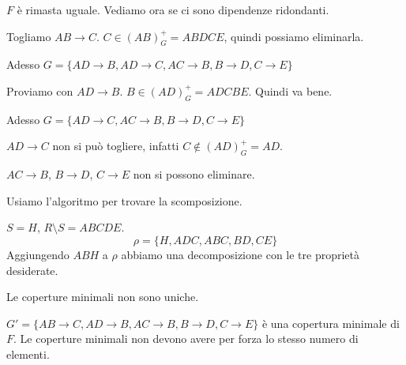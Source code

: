 \begin{exmp}
$F$ \`e rimasta uguale. Vediamo ora se ci sono dipendenze ridondanti.

Togliamo $AB \to C$. $C \in (AB)^+_G = ABDCE$, quindi possiamo eliminarla.

Adesso $G = \{ AD \to B, AD \to C, AC \to B, B \to D, C \to E \}$

Proviamo con $AD \to B$. $B \in (AD)^+_G = ADCBE$. Quindi va bene.

Adesso $G = \{ AD \to C, AC \to B, B \to D, C \to E \}$

$AD \to C$ non si pu\`o togliere, infatti $C \notin (AD)^+_G = AD$.

$AC \to B$, $B \to D$, $C \to E$ non si possono eliminare.

Usiamo l'algoritmo per trovare la scomposizione.

$S = H$, $R \setminus S = ABCDE$.
\[
\rho = \{ H, ADC, ABC, BD, CE \}
\]
Aggiungendo $ABH$ a $\rho$ abbiamo una decomposizione con le tre propriet\`a desiderate.

Le coperture minimali non sono uniche.

$G' = \{ AB \to C, AD \to B, AC \to B, B \to D, C \to E \}$ \`e una copertura minimale di $F$. Le coperture minimali non devono avere per forza lo stesso numero di elementi.
\end{exmp}



















